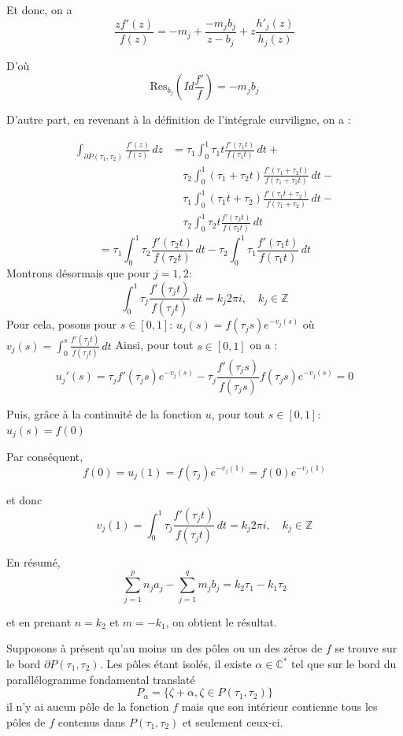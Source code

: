 \documentclass{article}
\begin{document}
Et donc, on a
\[
\frac{z f'(z)}{f(z)} = -m_j + \frac{-m_j b_j }{z - b_j} + z\frac{ h'_j(z)}{h_j(z)}
\]

D'où
\[
\text{Res}_{b_j} \left( Id\frac{f'}{f} \right) = -m_j b_j
\]

D'autre part, en revenant à la définition de l'intégrale curviligne, on a :

\begin{align*}
    \int_{\partial P(\tau_1,\tau_2)} \frac{f'(z)}{f(z)} \, dz &= \tau_1 \int_0^1 \tau_1 t \frac{f'(\tau_1 t)}{f(\tau_1 t)} \, dt + \\
    &\quad \tau_2 \int_0^1 (\tau_1 + \tau_2 t) \frac{f'(\tau_1 + \tau_2 t)}{f(\tau_1 + \tau_2 t)} \, dt - \\
    &\quad \tau_1 \int_0^1 (\tau_1 t + \tau_2) \frac{f'(\tau_1 t + \tau_2)}{f(\tau_1 + \tau_2)} \, dt - \\
    &\quad \tau_2 \int_0^1 \tau_2 t \frac{f'(\tau_2 t)}{f(\tau_2 t)} \, dt
    \end{align*}
\[
= \tau_1 \int_0^1 \tau_2\frac{f'(\tau_2 t)}{f(\tau_2 t)} \, dt - \tau_2 \int_0^1 \tau_1\frac{f'(\tau_1 t)}{f(\tau_1 t)} \, dt
\]
Montrons désormais que pour \( j = 1, 2 \):
\[
\int_0^1 \tau_j\frac{f'(\tau_j t)}{f(\tau_j t)} \, dt = k_j 2\pi i, \quad k_j \in \mathbb{Z}
\]
Pour cela, posons pour \( s \in [0,1] \): \( u_j(s) = f(\tau_j s)e^{-v_j(s)} \) où \( v_j(s) = \int_0^s \frac{f'(\tau_j t)}{f(\tau_j t)} \, dt \)
Ainsi, pour tout \( s \in [0, 1] \) on a :
\[
u_j'(s) = \tau_j f'(\tau_j s)e^{-v_j(s)} - \tau_j \frac{f'(\tau_j s)}{f(\tau_j s)} f(\tau_j s)e^{-v_j(s)} = 0
\]

Puis, grâce à la continuité de la fonction \( u \), pour tout \( s \in [0,1] \): \( u_j(s) = f(0) \)

Par conséquent,
\[
f(0) = u_j(1) = f(\tau_j)e^{-v_j(1)} = f(0)e^{-v_j(1)}
\]

et donc
\[
v_j(1) = \int_0^1 \tau_j\frac{f'(\tau_j t)}{f(\tau_j t)} \, dt = k_j 2\pi i, \quad k_j \in \mathbb{Z}
\]

En résumé,
\[
\sum_{j=1}^p n_j a_j - \sum_{j=1}^q m_j b_j = k_2\tau_1 - k_1\tau_2
\]

et en prenant \( n = k_2 \) et \( m = -k_1 \), on obtient le résultat.

Supposons à présent qu'au moins un des pôles ou un des zéros de \( f \) se trouve sur le bord \( \partial P(\tau_1, \tau_2) \). Les pôles étant isolés, il existe \( \alpha \in \mathbb{C}^* \) tel que sur le bord du parallélogramme fondamental translaté
\[
P_\alpha = \{\zeta + \alpha, \zeta \in P(\tau_1, \tau_2)\}
\]
il n'y ai aucun pôle de la fonction \( f \) mais que son intérieur contienne tous les pôles de \( f \) contenus dans \( P(\tau_1, \tau_2) \) et seulement ceux-ci.
\end{document}
